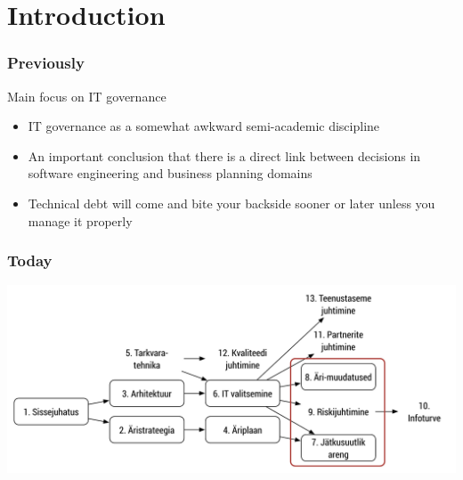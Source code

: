 

\maketitle

\section{Introduction}
\begin{frame}[fragile]
  \frametitle{Previously}
  Main focus on IT governance
	\begin{itemize}
		\item IT governance as a somewhat awkward semi-academic discipline
		\item An important conclusion that there is a direct link between decisions in software engineering and business planning domains
		\item Technical debt will come and bite your backside sooner or later unless you manage it properly
	\end{itemize}
\end{frame}

\begin{frame}[fragile]
  \frametitle{Today}
		\includegraphics[width=\textwidth]{aine_struktuur_kolmas.pdf}
\end{frame}

